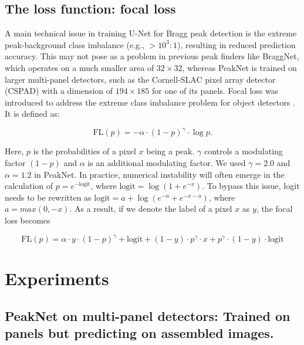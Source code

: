 \documentclass[conference]{IEEEtran}
\newcommand{\peaknet}{PeakNet}
\begin{document}
\subsection{The loss function: focal loss}

A main technical issue in training U-Net for Bragg peak detection is the extreme
peak-background class imbalance (e.g., $> 10^3 : 1$), resulting in reduced
prediction accuracy.  This may not pose as a problem in previous peak finders
like BraggNet, which operates on a much smaller area of $32 \times 32$, whereas
\peaknet{} is trained on larger multi-panel detectors, such as the
Cornell-SLAC pixel array detector (CSPAD) \citep{hartCornellSLACPixelArray2012}
with a dimension of $194 \times 185$ for one of its panels.  Focal loss was
introduced to address the extreme class imbalance problem for object detectors
\citep{linFocalLossDense2018}.  It is defined as:

\begin{equation}
    \text{FL}(p) = -\alpha \cdot (1-p)^\gamma \cdot \log{p}.
\end{equation}

Here, $p$ is the probabilities of a
pixel $x$ being a peak.  $\gamma$ controls a modulating factor
$(1-p)$ and $\alpha$ is an additional modulating factor.  We used $\gamma = 2.0$ and $\alpha = 1.2$ in \peaknet{}.  In
practice, numerical instability will often emerge in the calculation of
$p = e^{-\text{logit}}$, where $\text{logit} = \log{(1 + e^{-x})}$.  To bypass this issue,
logit needs to be rewritten as $\text{logit} = a + \log{(e^{-a} + e^{-x-a})}$,
where $a = max(0, -x)$.  As a result, if we denote the label of a pixel $x$ as $y$, the focal loss becomes

\begin{equation}
    \text{FL}(p) = \alpha \cdot y \cdot (1-p)^\gamma + \text{logit} + (1 - y) \cdot p^\gamma \cdot x + p^\gamma \cdot (1 - y) \cdot \text{logit}
\end{equation}



\section{Experiments}

\subsection{\peaknet{} on multi-panel detectors: Trained on panels but
predicting on assembled images.}
\end{document}
